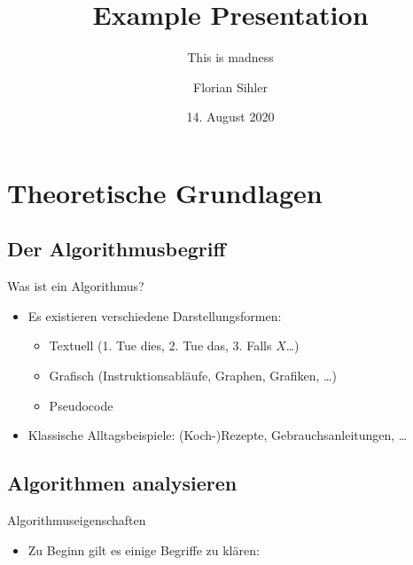 \documentclass[aspectratio=169,usepdftitle=true]{beamer}
\title{Example Presentation}
\subtitle{This is madness}
\date[14.08.2020]{14. August 2020}
\author[F.~Sihler]{Florian Sihler}
\begin{document}
\begin{frame}[c]
    \titlepage
\end{frame}

\section{Theoretische Grundlagen}
\subsection{Der Algorithmusbegriff}
\begin{frame}{Was ist ein Algorithmus?}
    \begin{itemize}
        \item Es existieren verschiedene Darstellungsformen: \begin{itemize}
            \item Textuell (1. Tue dies, 2. Tue das, 3. Falls \(X\)\ldots)
            \item Grafisch (Instruktionsabläufe, Graphen, Grafiken, \ldots)
            \item Pseudocode
        \end{itemize}
        \item Klassische Alltagsbeispiele: (Koch-)Rezepte, Gebrauchsanleitungen, \ldots
    \end{itemize}
\end{frame}

\subsection{Algorithmen analysieren}
\begin{frame}{Algorithmuseigenschaften}
    \begin{itemize}[<+(1)->]
        \item Zu Beginn gilt es einige Begriffe zu klären: 
    \end{itemize}
\end{frame}
\end{document}
